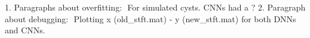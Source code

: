 \documentclass{article}
\begin{document}
1. Paragraphs about overfitting:  For simulated cysts. CNNs had a ?%
2. Paragraph about debugging:  Plotting x (old_stft.mat) - y (new_stft.mat) for both DNNs and CNNs. 
\end{document}
